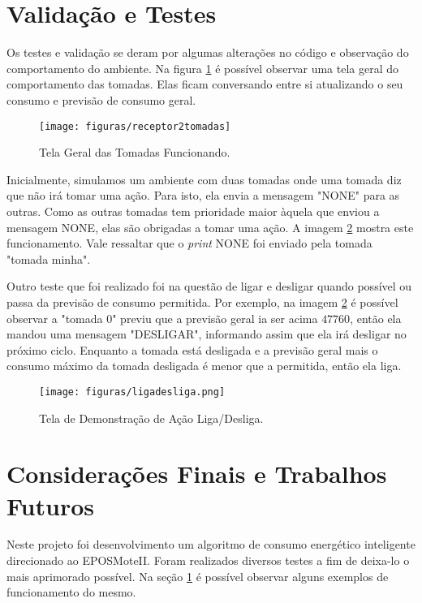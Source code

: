 \documentclass[article,11pt,oneside,a4paper,english,brazil]{abntex2}
\begin{document}
\section{Validação e Testes} \label{sec:validacaoetestes}
	
	Os testes e validação se deram por algumas alterações no código e observação do comportamento do ambiente. Na figura \ref{fig:receptor2tomadas} é possível observar uma tela geral do comportamento das tomadas. Elas ficam conversando entre si atualizando o seu consumo e previsão de consumo geral. 
	
	\begin{figure}[h]
		\centering
		\texttt{[image: figuras/receptor2tomadas]}
		\caption[Short]{Tela Geral das Tomadas Funcionando.}
		\label{fig:receptor2tomadas}
	\end{figure}
	
	Inicialmente, simulamos um ambiente com duas tomadas onde uma tomada diz que não irá tomar uma ação. Para isto, ela envia a mensagem "NONE" para as outras. Como as outras tomadas tem prioridade maior àquela que enviou a mensagem NONE, elas são obrigadas a tomar uma ação. A imagem \ref{fig:ligadesliga} mostra este funcionamento. Vale ressaltar que o \textit{print} NONE foi enviado pela tomada "tomada minha".
	
	Outro teste que foi realizado foi na questão de ligar e desligar quando possível ou passa da previsão de consumo permitida. Por exemplo, na imagem \ref{fig:ligadesliga} é possível observar a "tomada 0" previu que a previsão geral ia ser acima $47760$, então ela mandou uma mensagem "DESLIGAR", informando assim que ela irá desligar no próximo ciclo. Enquanto a tomada está desligada e a previsão geral mais o consumo máximo da tomada desligada é menor que a permitida, então ela liga.
		
	\begin{figure}[h]
		\centering
		\texttt{[image: figuras/ligadesliga.png]}
		\caption[Short]{Tela de Demonstração de Ação Liga/Desliga.}
		\label{fig:ligadesliga}
	\end{figure}

\section{Considerações Finais e Trabalhos Futuros} \label{sec:consideracoes}

		Neste projeto foi desenvolvimento um algoritmo de consumo energético inteligente direcionado ao EPOSMoteII. Foram realizados diversos testes a fim de deixa-lo o mais aprimorado possível. Na seção \ref{sec:validacaoetestes} é possível observar alguns exemplos de funcionamento do mesmo.
		
\end{document}
